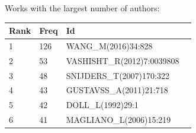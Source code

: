 \documentclass[hyperref={pdfstartview={FitBH -32768},
                         pdfpagemode=FullScreen,
                         plainpages=false,
                         colorlinks=true}
              ]{beamer}
\begin{document}
\begin{frame}[fragile]
Works with the largest number of authors:
\medskip
\begin{center}
\renewcommand{\arraystretch}{0.82}
\tiny 
\begin{tabular}{l|l|l|l|}
     Rank    & Freq & Id \\ \hline
         1   & 126  & WANG\_M(2016)34:828 \\
         2    & 53   & VASHISHT\_R(2012)7:0039808 \\ 
         3      & 48  & SNIJDERS\_T(2007)170:322 \\ 
         4     & 43  & GUSTAVSS\_A(2011)21:718  \\ 
         5    & 42   & DOLL\_L(1992)29:1 \\ 
         6   &41 &  MAGLIANO\_L(2006)15:219 \\ \hline
\end{tabular}
\end{center}

\end{frame}
\end{document}
